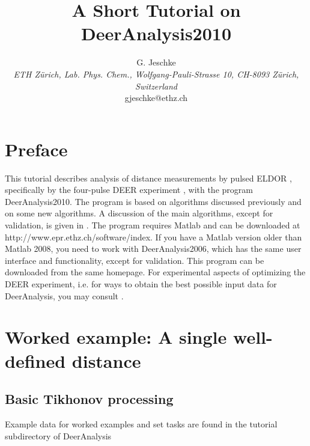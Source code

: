 \documentclass[11pt,a4paper]{article}
\title{A Short Tutorial on DeerAnalysis2010}
\author{G. Jeschke \\ \emph{ETH Z\"urich, Lab. Phys. Chem., Wolfgang-Pauli-Strasse 10, CH-8093 Z\"urich, Switzerland} \\ gjeschke@ethz.ch}
\begin{document}
\maketitle

\section{Preface}

This tutorial describes analysis of distance measurements by pulsed ELDOR \cite{milov1981,milovrev}, specifically by the four-pulse DEER experiment \cite{pannier2000,jeschke2002,jeschkerev}, with the program DeerAnalysis2010. The program is based on algorithms discussed previously \cite{jeschke2001,jeschke2004,chiang2005} and on some new algorithms. A discussion of the main algorithms, except for validation, is given in \cite{jeschke2006}. The program requires Matlab and can be downloaded at http://www.epr.ethz.ch/software/index. If you have a Matlab version older than Matlab 2008, you need to work with DeerAnalysis2006, which has the same user interface and functionality, except for validation. This program can be downloaded from the same homepage. For experimental aspects of optimizing the DEER experiment, i.e. for ways to obtain the best possible input data for DeerAnalysis, you may consult \cite{jeschke2007}.

\section{Worked example: A single well-defined distance}

\subsection{Basic Tikhonov processing}

Example data for worked examples and set tasks are found in the {\ttfamily tutorial} subdirectory of {\ttfamily DeerAnalysis}
\end{document}

